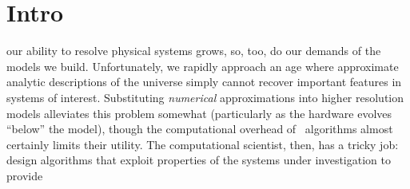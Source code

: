 \chapter{\label{ch:intro}Intro}
 our ability to resolve physical systems grows, so, too, do our demands of the models we build.
Unfortunately, we rapidly approach an age where approximate analytic descriptions of the universe simply cannot recover important features in systems of interest.
Substituting \emph{numerical} approximations into higher resolution models alleviates this problem somewhat (particularly as the hardware evolves ``below'' the model), though the computational overhead of \naive\ algorithms almost certainly limits their utility.
The computational scientist, then, has a tricky job: design algorithms that exploit properties of the systems under investigation to provide

